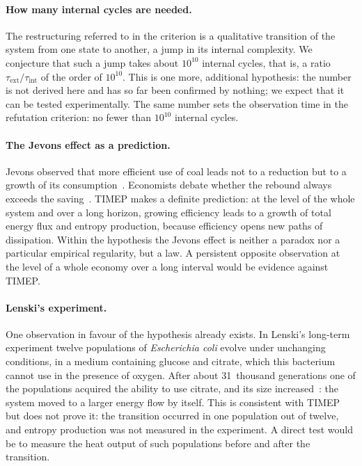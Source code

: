 \documentclass[11pt,a4paper]{article}
\begin{document}
\paragraph{How many internal cycles are needed.}
The restructuring referred to in the criterion is a qualitative transition of the system from one state to another, a jump in its internal complexity. We conjecture that such a jump takes about $10^{10}$ internal cycles, that is, a ratio $\tau_{\mathrm{ext}}/\tau_{\mathrm{int}}$ of the order of $10^{10}$. This is one more, additional hypothesis: the number is not derived here and has so far been confirmed by nothing; we expect that it can be tested experimentally. The same number sets the observation time in the refutation criterion: no fewer than $10^{10}$ internal cycles.

\paragraph{The Jevons effect as a prediction.}
Jevons observed that more efficient use of coal leads not to a reduction but to a growth of its consumption~\cite{jevons1865}. Economists debate whether the rebound always exceeds the saving~\cite{alcott2005,sorrell2009}. TIMEP makes a definite prediction: at the level of the whole system and over a long horizon, growing efficiency leads to a growth of total energy flux and entropy production, because efficiency opens new paths of dissipation. Within the hypothesis the Jevons effect is neither a paradox nor a particular empirical regularity, but a law. A persistent opposite observation at the level of a whole economy over a long interval would be evidence against TIMEP.

\paragraph{Lenski's experiment.}
One observation in favour of the hypothesis already exists. In Lenski's long-term experiment twelve populations of \emph{Escherichia coli} evolve under unchanging conditions, in a medium containing glucose and citrate, which this bacterium cannot use in the presence of oxygen. After about 31~thousand generations one of the populations acquired the ability to use citrate, and its size increased~\cite{blount2008}: the system moved to a larger energy flow by itself. This is consistent with TIMEP but does not prove it: the transition occurred in one population out of twelve, and entropy production was not measured in the experiment. A direct test would be to measure the heat output of such populations before and after the transition.
\end{document}
